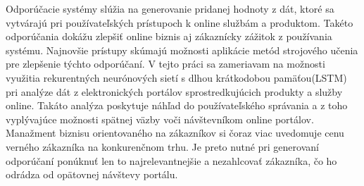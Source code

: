 Odporúčacie systémy slúžia na generovanie pridanej hodnoty z dát, ktoré sa vytvárajú pri používateľských prístupoch k online službám a produktom. Takéto odporúčania dokážu zlepšiť online biznis aj zákaznícky zážitok z používania systému. Najnovšie prístupy skúmajú možnosti aplikácie metód strojového učenia pre zlepšenie týchto odporúčaní. 
V tejto práci sa zameriavam na možnosti využitia rekurentných neurónových sietí s dlhou krátkodobou pamäťou(LSTM) pri analýze dát z elektronických portálov sprostredkujúcich produkty a služby online. Takáto analýza poskytuje náhľad do používateľského správania a z toho vyplývajúce možnosti spätnej väzby voči návštevníkom online portálov. Manažment biznisu orientovaného na zákazníkov si čoraz viac uvedomuje cenu verného zákazníka na konkurenčnom trhu. Je preto nutné pri generovaní odporúčaní ponúknuť len to najrelevantnejšie a nezahlcovať zákazníka, čo ho odrádza od opätovnej návštevy portálu.

